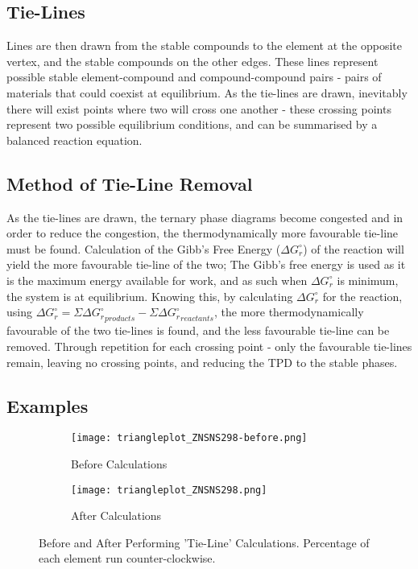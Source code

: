 \subsection{Tie-Lines}

Lines are then drawn from the stable compounds to the element at the opposite vertex, and the stable compounds on the other edges. These lines represent possible stable element-compound and compound-compound pairs - pairs of materials that could coexist at equilibrium. As the tie-lines are drawn, inevitably there will exist points where two will cross one another - these crossing points represent two possible equilibrium conditions, and can be summarised by a balanced reaction equation. 

\subsection{Method of Tie-Line Removal}

As the tie-lines are drawn, the ternary phase diagrams become congested and in order to reduce the congestion, the thermodynamically more favourable tie-line must be found. Calculation of the Gibb's Free Energy ($\Delta G_{r}^{\circ}$) of the reaction will yield the more favourable tie-line of the two; The Gibb's free energy is used as it is the maximum energy available for work, and as such when $\Delta G_{r}^{\circ}$ is minimum, the system is at equilibrium. Knowing this, by calculating $\Delta G_{r}^{\circ}$ for the reaction, using $\Delta G_{r}^{\circ} = \Sigma\Delta {G_{r}^{\circ}}_{products} - \Sigma\Delta {G_{r}^{\circ}}_{reactants}$, the more thermodynamically favourable of the two tie-lines is found, and the less favourable tie-line can be removed. Through repetition for each crossing point - only the favourable tie-lines remain, leaving no crossing points, and reducing the TPD to the stable phases.

\subsection{Examples}

\begin{figure}[ht]
\centering
\begin{subfigure}{80mm}
  \centering
    \texttt{[image: triangleplot\_ZNSNS298-before.png]}
    \caption{Before Calculations}
    \label{fig:ZnSnSBefore}
\end{subfigure}%
\begin{subfigure}{80mm}
 \centering
    \texttt{[image: triangleplot\_ZNSNS298.png]}
    \caption{After Calculations}
    \label{fig:ZnSnSAfter}
\end{subfigure}
\caption{Before and After Performing 'Tie-Line' Calculations. Percentage of each element run counter-clockwise.}
\label{fig:ZnSnSFigures}
\end{figure}

